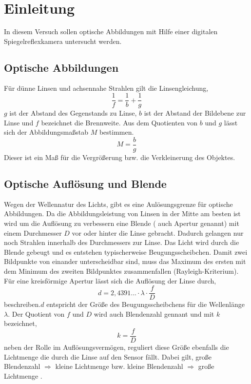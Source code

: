 \section{Einleitung}
In diesem Versuch sollen optische Abbildungen mit Hilfe einer digitalen Spiegelreflexkamera untersucht werden.
\subsection{Optische Abbildungen}
Für dünne Linsen und achsennahe Strahlen gilt die Linsengleichung,
\begin{equation}
\frac{1}{f}=\frac{1}{b}+\frac{1}{g}
\end{equation}
$ g $ ist der Abstand des Gegenstands zu Linse, $ b $ ist der Abstand der Bildebene zur Linse und $ f $ bezeichnet die Brennweite.
Aus dem Quotienten von $ b $ und $ g $ lässt sich der Abbildungsmaßstab $ M $ bestimmen.
\begin{equation}
M=\frac{b}{g}
\end{equation}
Dieser ist ein Maß für die Vergrößerung bzw. die Verkleinerung des Objektes.
\subsection{Optische Auflösung und Blende}
Wegen der Wellennatur des Lichts, gibt es eine Aulösungsgrenze für optische Abbildungen. Da die Abbildungsleistung von Linsen in der Mitte am besten ist wird um die Auflösung zu verbessern eine Blende ( auch Apertur genannt) mit einem Durchmesser $ D $ vor oder hinter die Linse gebracht. Dadurch gelangen nur noch Strahlen innerhalb des Durchmessers zur Linse. Das Licht wird durch die Blende gebeugt und es entstehen typischerweise Beugungsscheibchen. Damit zwei Bildpunkte von einander unterscheidbar sind, muss das Maximum des ersten mit dem Minimum des zweiten Bildpunktes zusammenfallen (Rayleigh-Kriterium).
Für eine kreisförmige Apertur lässt sich die Auflösung der Linse durch,
\begin{equation}
d=2,4391...\cdot\lambda\cdot\frac{f}{D}
\end{equation}
beschreiben.$ d $ entspricht der Größe des Beugungsscheibchens für die Wellenlänge $ \lambda $.
Der Quotient von $ f $ und $ D $ wird auch Blendenzahl gennant und mit $ k $ bezeichnet,
\begin{equation}
k=\frac{f}{D}
\end{equation}
neben der Rolle im Auflösungsvermögen, reguliert diese Größe ebenfalls die Lichtmenge die durch die Linse auf den Sensor fällt.
Dabei gilt,
 große Blendenzahl $ \Rightarrow $ kleine Lichtmenge  bzw.
 kleine Blendenzahl $ \Rightarrow $ große Lichtmenge .
